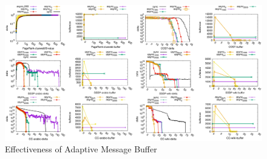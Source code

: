 \begin{figure}[!t]
	\vspace{0.0in}
	\centering
	\includegraphics[width=6.6in]{figuration/combine.eps}
	\vspace{-0.1in}
	\caption{Effectiveness of Adaptive Message Buffer}
	\label{fig:details}
	\vspace{-0.1in}
\end{figure}



